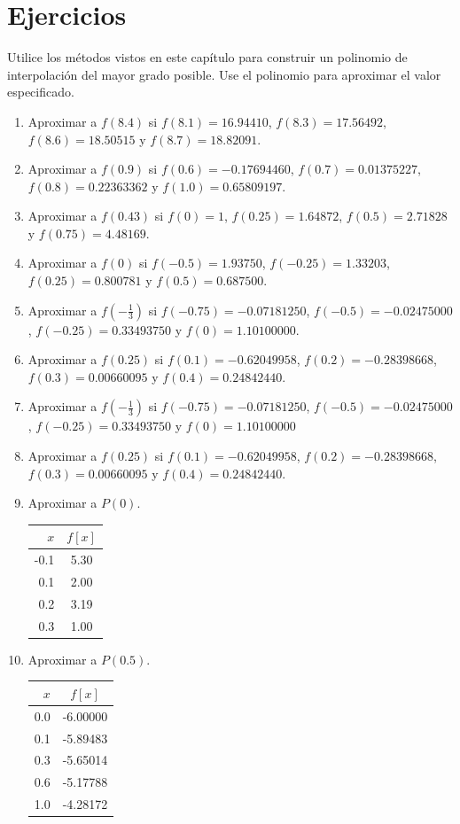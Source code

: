 \section{Ejercicios}
Utilice los métodos vistos en este capítulo para construir un polinomio de interpolación del mayor grado posible. Use el 
polinomio para aproximar el valor especificado.\\

\begin{enumerate}
	\item Aproximar a $f(8.4)$ si $f(8.1)=16.94410$, $f(8.3)=17.56492$, $f(8.6)=18.50515$ y $f(8.7)=18.82091$.
	\item Aproximar a $f(0.9)$ si $f(0.6)=-0.17694460$, $f(0.7)=0.01375227$, $f(0.8)=0.22363362$ y $f(1.0)=0.65809197$.
	\item Aproximar a $f(0.43)$ si $f(0)=1$, $f(0.25)=1.64872$, $f(0.5)=2.71828$ y $f(0.75)=4.48169$.
	\item Aproximar a $f(0)$ si $f(-0.5)=1.93750$, $f(-0.25)=1.33203$, $f(0.25)=0.800781$ y $f(0.5)=0.687500$.
	\item Aproximar a $f(-\frac{1}{3})$ si $f(-0.75)=-0.07181250$, $f(-0.5)=-0.02475000$, $f(-0.25)=0.33493750$ y $f(0)=1.10100000$.
	\item Aproximar a $f(0.25)$ si $f(0.1)=-0.62049958$, $f(0.2)=-0.28398668$, $f(0.3)=0.00660095$ y $f(0.4)=0.24842440$.
	\item Aproximar a $f(-\frac{1}{3})$ si $f(-0.75)=-0.07181250$, $f(-0.5)=-0.02475000$, $f(-0.25)=0.33493750$ y $f(0)=1.10100000$
	\item Aproximar a $f(0.25)$ si $f(0.1)=-0.62049958$, $f(0.2)=-0.28398668$, $f(0.3)=0.00660095$ y $f(0.4)=0.24842440$.
	\item Aproximar a $P(0)$.
		\begin{table}[H]
			\centering
      		\begin{tabular}{rc}
      			\toprule
				$x$ & $f[x]$ \\ \midrule
				-0.1 & 5.30\\
				0.1 & 2.00\\
				0.2 & 3.19\\
				0.3 & 1.00\\
				\bottomrule
      		\end{tabular}
		\end{table}
		
	\item Aproximar a $P(0.5)$.
		\begin{table}[H]
			\centering
      		\begin{tabular}{rc}
      			\toprule
				$x$ & $f[x]$ \\ \midrule
				0.0 & -6.00000\\
				0.1 & -5.89483\\
				0.3 & -5.65014\\
				0.6 & -5.17788\\
				1.0 & -4.28172\\
				\bottomrule
      		\end{tabular}
		\end{table}
\end{enumerate}